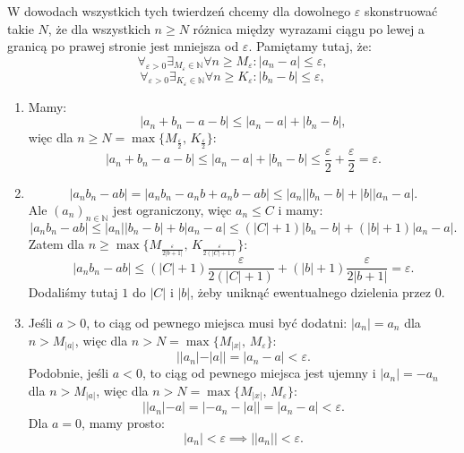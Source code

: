 \documentclass{article}
\numberwithin{defi}{section}
\numberwithin{defi}{section}
\newcommand{\N}{\mathbb{N}}
\providecommand{\eps}{\varepsilon}
\newcommand{\ciag}[1]{(#1_{n})_{n \in \N}}
\begin{document}
\begin{dow}
    W dowodach wszystkich tych twierdzeń chcemy dla dowolnego $\eps$ skonstruować takie $N$, że dla wszystkich $n \geqslant N$  różnica między wyrazami ciągu po lewej a granicą po prawej stronie jest mniejsza od $\eps$. Pamiętamy tutaj, że:
    \begin{equation}
        \forall_{\eps > 0} \exists_{M_{\eps} \in \N} \forall{n \geqslant M_{\eps}}: |a_n - a| \leqslant \eps,
    \end{equation}
    \begin{equation}
        \forall_{\eps > 0} \exists_{K_{\eps} \in \N} \forall{n \geqslant K_{\eps}}: |b_n - b| \leqslant \eps,
    \end{equation}

    \begin{enumerate}
        \item Mamy: \begin{equation}
                  |a_n + b_n - a - b| \leqslant |a_n - a| + |b_n - b|,
              \end{equation}
              więc dla $n \geqslant N = \max\{M_{\frac{\eps}{2}},\, K_{\frac{\eps}{2}}\}$: \begin{equation}
                  |a_n + b_n - a - b| \leqslant |a_n - a| + |b_n - b| \leqslant \frac{\eps}{2} + \frac{\eps}{2}  = \eps.
              \end{equation}

        \item \begin{equation}
                  | a_n b_n - ab| = |a_n b_n - a_n b + a_n b - ab| \leqslant |a_n| |b_n - b| + |b| |a_n -a|.
              \end{equation}
              Ale $\ciag{a}$ jest ograniczony, więc $a_n \leqslant C$ i mamy: \begin{equation}
                  | a_n b_n - ab|  \leqslant |a_n| |b_n - b| + b |a_n -a| \leqslant (|C| +1) |b_n - b| + (|b| +1) |a_n -a|.
              \end{equation}
              Zatem dla $n \geqslant \max\{M_{\frac{\eps}{2|b+1|}}, \, K_{\frac{\eps}{2(|C| +1 )}} \}$: \begin{equation}
                  | a_n b_n - ab| \leqslant (|C| +1) \frac{\eps}{2(|C| +1 )} + (|b| +1) \frac{\eps}{2|b+1|} = \eps.
              \end{equation}
              Dodaliśmy tutaj $1$ do $|C|$ i $|b|$, żeby uniknąć ewentualnego dzielenia przez $0$.


        \item Jeśli $a > 0$, to ciąg od pewnego miejsca musi być dodatni: $|a_n| = a_n$ dla $n > M_{|a|}$, więc dla $n > N = \max\{M_{|x|}, \, M_{\eps}\}$:
              \[ ||a_n| - |a|| = |a_n - a| < \eps. \]
              Podobnie, jeśli $a < 0$, to ciąg od pewnego miejsca jest ujemny i $|a_n| = -a_n$ dla $n > M_{|a|}$, więc dla $n > N = \max\{M_{|x|}, \, M_{\eps}\}$:
              \[ ||a_n| - a| = |-a_n - |a|| = |a_n -a| < \eps. \]
              Dla $a = 0$, mamy prosto:
              \[ |a_n| < \eps \implies ||a_n|| < \eps. \]


\end{enumerate}
\end{dow}
\end{document}
